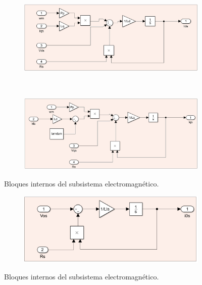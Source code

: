\documentclass{article}
\begin{document}
\begin{figure}[H]
    \centering
    \begin{subfigure}[]{0.75\textwidth}
        \centering
        \includegraphics[width=1\textwidth]{sub_electromagentico4.png}
    \end{subfigure}
    \\
    \begin{subfigure}[b]{0.75\textwidth}
        \centering
        \includegraphics[width=1\textwidth]{sub_electromagentico3.png}
    \end{subfigure}
    \caption{Bloques internos del subsistema electromagnético.}
\end{figure}

\begin{figure}[H]
    \centering
    \begin{subfigure}[b]{0.75\textwidth}
        \centering
        \includegraphics[width=1\textwidth]{sub_electromagentico2.png}
    \end{subfigure}
    \caption{Bloques internos del subsistema electromagnético.}
\end{figure}
\end{document}
